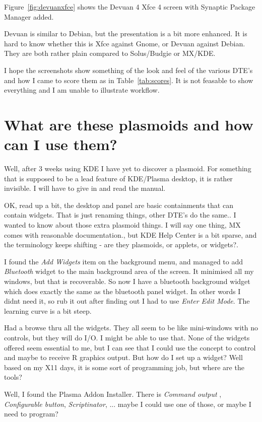 \documentclass{article}  %
\begin{document}
Figure~\ref{fig:devuanxfce} shows the Devuan 4 Xfce 4  screen with Synaptic Package Manager added. 

Devuan is similar to Debian, but the presentation is a bit more enhanced. It is hard to know whether this is Xfce against Gnome, or Devuan against Debian. They are both rather plain compared to Solus/Budgie or MX/KDE.

I hope the screenshots show something of the look and feel of the various DTE's and how I came to score them as in Table~\ref{tab:scores}. It is not feasable to show everything and I am unable to illustrate workflow.


\clearpage
\section{What are these plasmoids and how can I use them?}
Well, after 3 weeks using KDE I have yet to discover a plasmoid. For something that is supposed to be a lead feature of KDE/Plasma desktop, it is rather invisible.  I will have to give in and read the manual.

OK, read up a bit,  the desktop and panel are basic containments that can contain widgets.  That is just renaming things, other DTE's do the same.. I wanted to know about those extra plasmoid things.  I will say one thing, MX comes with reasonable documentation., but KDE Help Center is a bit sparse, and the terminology keeps shifting - are they plasmoids, or applets, or widgets?.

I found the {\em Add Widgets} item on the background menu, and managed to add  {\em Bluetooth} widget to the main background area of the screen. It minimised all my windows, but that is recoverable. So now I have a bluetooth background widget which does exactly the same as the bluetooth panel widget. In other words I didnt need it, so rub it out after finding out I had to use {\em Enter Edit Mode}.  The learning curve is a bit steep.

 Had a browse thru all the widgets. They all seem to be like mini-windows with no controls, but they will do I/O. I might be able to use that.  None of the widgets offered seem essential to me, but I can see that I could use the concept to control and maybe to receive R graphics output. But how do I set up a widget? Well based on my X11 days, it is some sort of programming job, but where are the tools? 

Well, I found the Plasma Addon Installer. There is {\em Command output} , {\em Configurable button},  {\em Scriptinator},  ...  maybe I could use one of those, or maybe I need to program?
\end{document}

